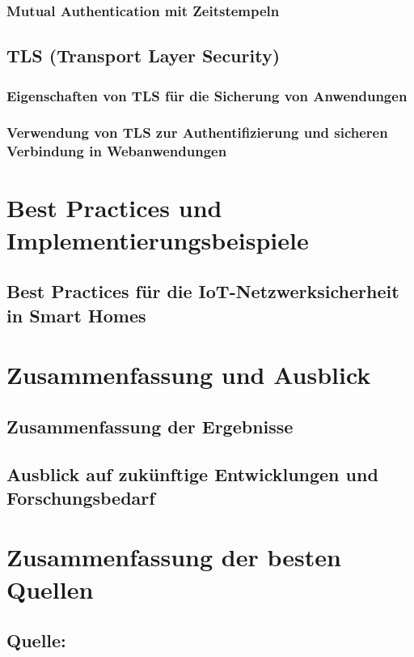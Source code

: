 \subsubsection{Mutual Authentication mit Zeitstempeln}

\subsection{TLS (Transport Layer Security)}
\subsubsection{Eigenschaften von TLS für die Sicherung von Anwendungen}
\subsubsection{Verwendung von TLS zur Authentifizierung und sicheren Verbindung in Webanwendungen}


\newpage
\section{Best Practices und Implementierungsbeispiele}

\subsection{Best Practices für die IoT-Netzwerksicherheit in Smart Homes}


\newpage
\section{Zusammenfassung und Ausblick}

\subsection{Zusammenfassung der Ergebnisse}
\subsection{Ausblick auf zukünftige Entwicklungen und Forschungsbedarf}

\newpage

\section{Zusammenfassung der besten Quellen}
\subsection{Quelle: \cite{khatoun2022cybersecurity}}

